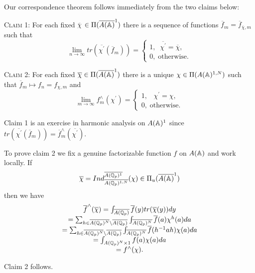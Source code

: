 Our correspondence theorem follows immediately from the two claims below:

\textsc{Claim 1}: For each fixed $\overline{\chi }$
$\in \Pi (\overline{A({\Bbb{A}})}^1)$ there is a sequence of
functions
$\overline{f}_m
=\overline{f}_{\overline{\chi },m}$ such that 
\[
\lim_{n\rightarrow \infty }
tr(\overline{\chi ^{\prime }}(\overline{f}_m))
=\left\{ 
\begin{array}{c}
1,\;\;\overline{\chi ^{\prime }}=\overline{\chi }, \\ 
0,\;\mathrm{otherwise}.
\end{array}
\right. 
\]

\textsc{Claim 2}: For each fixed
$\overline{\chi }\in \Pi (\overline{A({\Bbb{A}})}^1)$
there is a unique $\chi \in \Pi (A({\Bbb{A}})^{1,N})$ such that
$\overline{f}_m\longmapsto f_n=f_{\chi ,m}$ and 
\[
\lim_{m\rightarrow \infty }f_m^{\wedge }(\chi ^{\prime })=\left\{ 
\begin{array}{c}
1,\;\;\;\chi ^{\prime }=\chi , \\ 
0,\;\mathrm{otherwise}.
\end{array}
\right. 
\]

Claim 1 is an exercise in harmonic analysis on $A({\Bbb{A}})^1$ since
$tr(\overline{\chi ^{\prime }}(\overline{f}_m))
=\overline{f}_m^{\wedge }(\overline{\chi ^{\prime }})$.

To prove claim 2 we fix a genuine factorizable function $f$ on $A({\Bbb{A}})$
and work locally. If 
\[
\overline{\chi }=
Ind_{\overline{A({\Bbb{Q}}_p)^{1,N}}}^{\overline{A({\Bbb{Q}}_p)^1}}
(\chi )\in \Pi_u (\overline{A({\Bbb{A}})}^1)
\]
then we have 
\begin{equation}
\begin{array}{c}
\overline{f}^{\wedge }(\overline{\chi })
=\int_{\overline{A({\Bbb{Q}}_p)}}
\overline{f}(y)tr(\overline{\chi }(y))dy \\ 
=\sum_{h\in \overline{A({\Bbb{Q}}_p)^N}
\backslash \overline{A({\Bbb{Q}}_p)}}
\int_{\overline{A({\Bbb{Q}}_p)^N}}
\overline{f}(a)\chi ^h(a)da \\ 
=\sum_{h\in \overline{A({\Bbb{Q}}_p)^N}
\backslash \overline{A({\Bbb{Q}}_p)}}
\int_{\overline{A({\Bbb{Q}}_p)^N}}
\overline{f}(h^{-1}ah)\chi (a)da \\ 
=\int_{A({\Bbb{Q}}_p)^N\times 1}
f(a)\chi (a)da \\ 
=f^{\wedge }(\chi ).
\end{array}
\end{equation}

Claim 2 follows.

